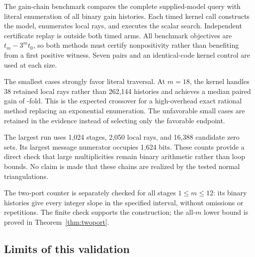 The gain-chain benchmark compares the complete supplied-model query with
literal enumeration of all binary gain histories. Each timed kernel call
constructs the model, enumerates local rays, and executes the scalar search.
Independent certificate replay is outside both timed arms. All benchmark
objectives are $t_m-3^m t_0$, so both methods must certify nonpositivity rather
than benefiting from a first positive witness. Seven pairs and an identical-code
kernel control are used at each size.

\begin{table}[ht]
\centering\small

\caption{Algebraic gain-chain timings. ``Paired gain'' is the median of the
seven literal/kernel ratios, not the ratio of the two reported medians.
The literal baseline is complete history enumeration, not the best algorithm
for this analytically soluble family.}
\end{table}

The smallest cases strongly favor literal traversal. At $m=18$, the kernel
handles 38 retained local rays rather than 262,144 histories and achieves a
median paired gain of \LastGain-fold. This is the expected crossover for a
high-overhead exact rational method replacing an exponential enumeration.
The unfavorable small cases are retained in the evidence instead of selecting
only the favorable endpoint.

\begin{table}[ht]
\centering\small

\caption{Larger supplied algebraic chains. These are single unpaired scaling
runs, not stable comparative timing estimates. There are $2^m$ admissible
histories, none explicitly enumerated by the kernel.}
\end{table}

The largest run uses 1,024 stages, 2,050 local rays, and 16,388 candidate zero
sets. Its largest message numerator occupies 1,624 bits. These counts provide
a direct check that large multiplicities remain binary arithmetic rather than
loop bounds. No claim is made that these chains are realized by the tested
normal triangulations.

The two-port counter is separately checked for all stages $1\leq m\leq12$:
its binary histories give every integer slope in the specified interval,
without omissions or repetitions. The finite check supports the construction;
the all-$m$ lower bound is proved in Theorem~\ref{thm:twoport}.

\subsection{Limits of this validation}

